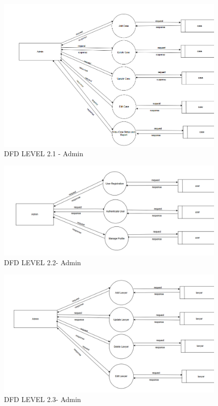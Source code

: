 \begin{figure}
  \centering
  \includegraphics[width=0.8\linewidth]{Admin2.1case.png}
 \caption{DFD LEVEL 2.1 - Admin}
   \label{fig:DFD LEVEL 2.1 - Admin}
\end{figure}

\begin{figure}
  \centering
  \includegraphics[width=0.8\linewidth]{Admin2.2user.png}
 \caption{DFD LEVEL 2.2- Admin}
   \label{fig:DFD LEVEL 2.2 - Admin}
\end{figure}

\begin{figure}
  \centering
  \includegraphics[width=0.8\linewidth]{Admin2.3lawyer.png}
 \caption{DFD LEVEL 2.3- Admin}
   \label{fig:DFD LEVEL 2.3 - Admin}
\end{figure}

